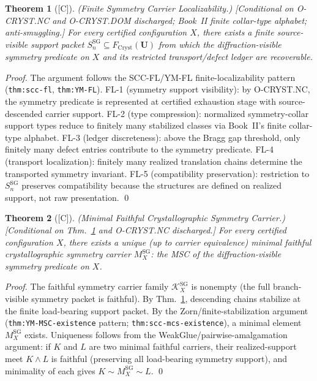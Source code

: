 \documentclass[12pt,oneside]{amsbook}
\theoremstyle{plain}
\newtheorem{theorem}{Theorem}[section]
\theoremstyle{definition}
\theoremstyle{remark}
\newcommand{\status}[1]{\textup{[#1]}}
\begin{document}
\begin{theorem}[\status{C}]\label{thm:cryst-SG-FL}
\textup{(Finite Symmetry Carrier Localizability.)}
\textup{[Conditional on O-CRYST.NC and O-CRYST.DOM discharged;
Book~II finite collar-type alphabet; anti-smuggling.]}
For every certified configuration $X$, there exists a finite
source-visible support packet $S^{\mathrm{SG}}_n \subseteq
F_{\mathrm{Cryst}}(\mathbf{U})$ from which the diffraction-visible
symmetry predicate on $X$ and its restricted transport/defect
ledger are recoverable.
\end{theorem}

\begin{proof}
The argument follows the SCC-FL/YM-FL finite-localizability
pattern (\texttt{thm:scc-fl}, \texttt{thm:YM-FL}).
FL-1 (symmetry support visibility): by O-CRYST.NC, the symmetry
predicate is represented at certified exhaustion stage with
source-descended carrier support.
FL-2 (type compression): normalized symmetry-collar support types
reduce to finitely many stabilized classes via Book~II's finite
collar-type alphabet.
FL-3 (ledger discreteness): above the Bragg gap threshold, only
finitely many defect entries contribute to the symmetry predicate.
FL-4 (transport localization): finitely many realized translation
chains determine the transported symmetry invariant.
FL-5 (compatibility preservation): restriction to $S^{\mathrm{SG}}_n$
preserves compatibility because the structures are defined on
realized support, not raw presentation.
\qed
\end{proof}

\begin{theorem}[\status{C}]\label{thm:cryst-SG-MSC}
\textup{(Minimal Faithful Crystallographic Symmetry Carrier.)}
\textup{[Conditional on Thm.~\ref{thm:cryst-SG-FL} and
O-CRYST.NC discharged.]}
For every certified configuration $X$, there exists a unique (up to
carrier equivalence) minimal faithful crystallographic symmetry
carrier $M^{\mathrm{SG}}_X$: the MSC of the diffraction-visible
symmetry predicate on $X$.
\end{theorem}

\begin{proof}
The faithful symmetry carrier family $\mathcal{K}^{\mathrm{SG}}_X$
is nonempty (the full branch-visible symmetry packet is faithful).
By Thm.~\ref{thm:cryst-SG-FL}, descending chains stabilize at
the finite load-bearing support packet.  By the
Zorn/finite-stabilization argument (\texttt{thm:YM-MSC-existence}
pattern; \texttt{thm:scc-mcs-existence}), a minimal element
$M^{\mathrm{SG}}_X$ exists.  Uniqueness follows from the
WeakGlue/pairwise-amalgamation argument: if $K$ and $L$ are two
minimal faithful carriers, their realized-support meet $K \wedge L$
is faithful (preserving all load-bearing symmetry support), and
minimality of each gives $K \sim M^{\mathrm{SG}}_X \sim L$.
\qed
\end{proof}
\end{document}
